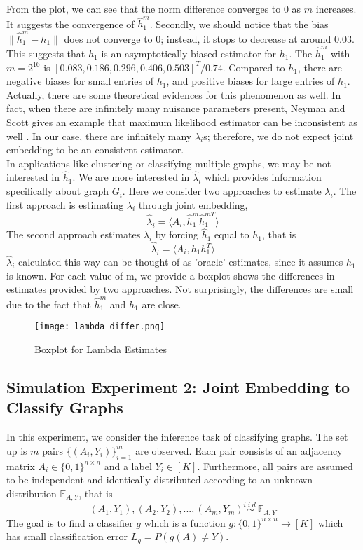 \documentclass[10pt,journal,compsoc]{IEEEtran}
\begin{document}
\noindent From the plot, we can see that the norm difference converges to $0$ as $m$ increases. It suggests the convergence of $\hat{h}_1^m$. Secondly, we should notice that the bias $\|\hat{h}^m_1-h_1\|$ does not converge to $0$; instead, it stops to decrease at around $0.03$. This suggests that $\hat{h}_1$ is an asymptotically biased estimator for $h_1$. The $\hat{h}_1^m$ with $m=2^{16}$ is $[0.083,0.186, 0.296, 0.406, 0.503]^T/0.74$. Compared to $h_1$, there are negative biases for small entries of $h_1$, and positive biases for large entries of $h_1$. Actually, there are some theoretical evidences for this phenomenon as well. In fact, when there are infinitely many nuisance parameters present, Neyman and Scott gives an example that maximum likelihood estimator can be inconsistent as well \cite{neyman1948consistent}. In our case, there are infinitely many $\lambda_i$s; therefore, we do not expect joint embedding to be an consistent estimator. \\

\noindent In applications like clustering or classifying multiple graphs, we may be not interested in $\hat{h}_1$. We are more interested in $\hat{\lambda}_i$ which provides information specifically about graph $G_i$. Here we consider two approaches to estimate $\lambda_i$. The first approach is estimating $\lambda_i$ through joint embedding,
\[ \hat{\lambda}_i = \langle A_i,  \hat{h}^m_1 \hat{h}^{m T}_1 \rangle \]
The second approach estimates $\lambda_i$ by forcing $\hat{h}_1$ equal to $h_1$, that is 
\[ \hat{\lambda}_i = \langle A_i,  h_1 h_1^T \rangle \]
$\hat{\lambda}_i$ calculated this way can be thought of as 'oracle' estimates, since it assumes $h_1$ is known. For each value of m, we provide a boxplot shows the differences in estimates provided by two approaches. Not surprisingly, the differences are small due to the fact that $\hat{h}_1^m$ and $h_1$ are close.
\begin{figure}[!htbp]
	\centering
	\texttt{[image: lambda\_differ.png]}
	\caption{Boxplot for Lambda Estimates}
\end{figure}

\subsection{Simulation Experiment 2: Joint Embedding to Classify Graphs}
In this experiment, we consider the inference task of classifying graphs.  The set up is $m$ pairs $\{(A_i,Y_i)\}_{i=1}^{m}$ are observed. Each pair consists of an adjacency matrix $A_i \in \{0,1\}^{n \times n}$ and a label $Y_i \in [K]$. Furthermore, all pairs are assumed to be independent and identically distributed according to an unknown distribution $\mathbb{F}_{A,Y}$, that is
\[(A_1,Y_1),(A_2,Y_2),...,(A_m,Y_m) \overset{i.i.d.}{\sim} \mathbb{F}_{A,Y} \] 
The goal is to find a classifier $g$ which is a function $g:\{0,1\}^{n \times n} \rightarrow [K]$ which has small classification error $L_g=P(g(A)\neq Y)$. \\ 
\end{document}
